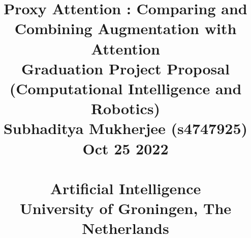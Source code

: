\documentclass[a4paper,14pt]{article}
\begin{document}
\pagestyle{body}


\title{
    \vspace{1cm}
        {\bf
        {\Huge Proxy Attention : Comparing and Combining Augmentation with Attention\\
        }
        }
        \vspace{4mm}Graduation Project Proposal\\(Computational Intelligence and Robotics)\\
        \vspace{4mm}Subhaditya Mukherjee (s4747925)\\Oct 25 2022\\
        \vspace{10cm}{\LARGE Internal Supervisor(s): S.H. Mohades Kasaei, PhD (Artificial Intelligence, University of Groningen)}\\
        {\bf {Artificial Intelligence\\University of Groningen, The Netherlands}}
}
\date{}

\maketitle
\thispagestyle{titlepage}





    
\end{document}
